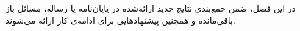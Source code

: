 
در این فصل، ضمن جمع‌بندی نتایج جدید ارائه‌شده در پایان‌نامه یا رساله، 
مسائل باز باقی‌مانده و همچنین پیشنهادهایی برای ادامه‌ی کار ارائه می‌شوند.
